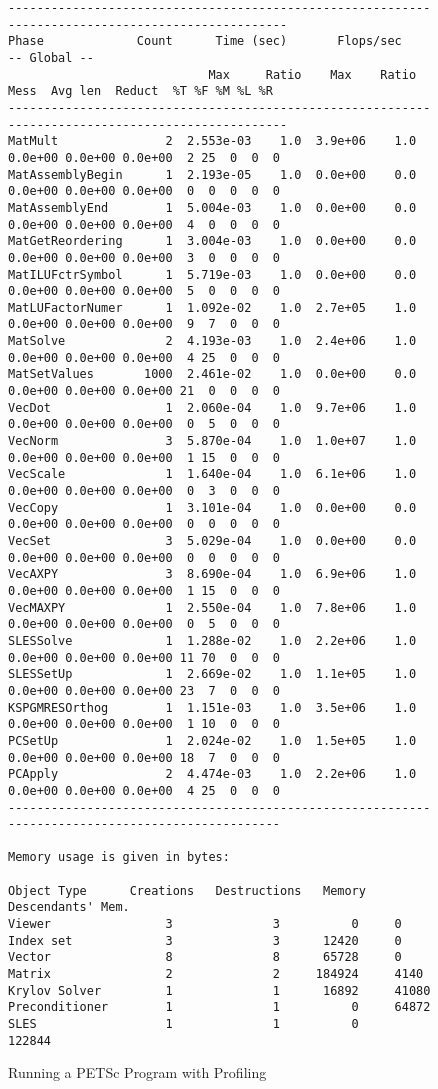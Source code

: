\begin{figure}[H]
{\begin{verbatim}
--------------------------------------------------------------------------------------------------
Phase             Count      Time (sec)       Flops/sec                             -- Global --    
                            Max     Ratio    Max    Ratio   Mess  Avg len  Reduct  %T %F %M %L %R   
--------------------------------------------------------------------------------------------------
MatMult               2  2.553e-03    1.0  3.9e+06    1.0  0.0e+00 0.0e+00 0.0e+00  2 25  0  0  0
MatAssemblyBegin      1  2.193e-05    1.0  0.0e+00    0.0  0.0e+00 0.0e+00 0.0e+00  0  0  0  0  0
MatAssemblyEnd        1  5.004e-03    1.0  0.0e+00    0.0  0.0e+00 0.0e+00 0.0e+00  4  0  0  0  0
MatGetReordering      1  3.004e-03    1.0  0.0e+00    0.0  0.0e+00 0.0e+00 0.0e+00  3  0  0  0  0
MatILUFctrSymbol      1  5.719e-03    1.0  0.0e+00    0.0  0.0e+00 0.0e+00 0.0e+00  5  0  0  0  0
MatLUFactorNumer      1  1.092e-02    1.0  2.7e+05    1.0  0.0e+00 0.0e+00 0.0e+00  9  7  0  0  0
MatSolve              2  4.193e-03    1.0  2.4e+06    1.0  0.0e+00 0.0e+00 0.0e+00  4 25  0  0  0
MatSetValues       1000  2.461e-02    1.0  0.0e+00    0.0  0.0e+00 0.0e+00 0.0e+00 21  0  0  0  0
VecDot                1  2.060e-04    1.0  9.7e+06    1.0  0.0e+00 0.0e+00 0.0e+00  0  5  0  0  0
VecNorm               3  5.870e-04    1.0  1.0e+07    1.0  0.0e+00 0.0e+00 0.0e+00  1 15  0  0  0
VecScale              1  1.640e-04    1.0  6.1e+06    1.0  0.0e+00 0.0e+00 0.0e+00  0  3  0  0  0
VecCopy               1  3.101e-04    1.0  0.0e+00    0.0  0.0e+00 0.0e+00 0.0e+00  0  0  0  0  0
VecSet                3  5.029e-04    1.0  0.0e+00    0.0  0.0e+00 0.0e+00 0.0e+00  0  0  0  0  0
VecAXPY               3  8.690e-04    1.0  6.9e+06    1.0  0.0e+00 0.0e+00 0.0e+00  1 15  0  0  0
VecMAXPY              1  2.550e-04    1.0  7.8e+06    1.0  0.0e+00 0.0e+00 0.0e+00  0  5  0  0  0
SLESSolve             1  1.288e-02    1.0  2.2e+06    1.0  0.0e+00 0.0e+00 0.0e+00 11 70  0  0  0
SLESSetUp             1  2.669e-02    1.0  1.1e+05    1.0  0.0e+00 0.0e+00 0.0e+00 23  7  0  0  0
KSPGMRESOrthog        1  1.151e-03    1.0  3.5e+06    1.0  0.0e+00 0.0e+00 0.0e+00  1 10  0  0  0
PCSetUp               1  2.024e-02    1.0  1.5e+05    1.0  0.0e+00 0.0e+00 0.0e+00 18  7  0  0  0
PCApply               2  4.474e-03    1.0  2.2e+06    1.0  0.0e+00 0.0e+00 0.0e+00  4 25  0  0  0
-------------------------------------------------------------------------------------------------

Memory usage is given in bytes:

Object Type      Creations   Destructions   Memory  Descendants' Mem.
Viewer                3              3          0     0
Index set             3              3      12420     0
Vector                8              8      65728     0
Matrix                2              2     184924     4140
Krylov Solver         1              1      16892     41080
Preconditioner        1              1          0     64872
SLES                  1              1          0     122844

\end{verbatim}
}
\nobreak
\caption{Running a PETSc Program with Profiling}
\label{fig:exprof}
\end{figure}

